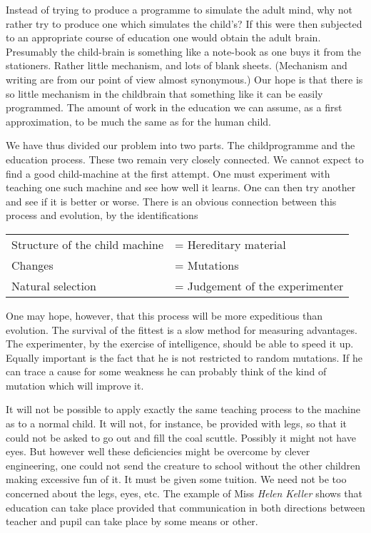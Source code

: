 \documentclass[12pt]{article}
\begin{document}
    Instead of trying to produce a programme to simulate the adult mind, why not rather try to produce one which simulates the child's? If this were then subjected to an appropriate course of education one would obtain the adult brain. Presumably the child-brain is something like a note-book as one buys it from the stationers. Rather little mechanism, and lots of blank sheets. (Mechanism and writing are from our point of view almost synonymous.) Our hope is that there is so little mechanism in the childbrain that something like it can be easily programmed. The amount of work in the education we can assume, as a first approximation, to be much the same as for the human child.

    We have thus divided our problem into two parts. The childprogramme and the education process. These two remain very closely connected. We cannot expect to find a good child-machine at the first attempt. One must experiment with teaching one such machine and see how well it learns. One can then try another and see if it is better or worse. There is an obvious connection between this process and evolution, by the identifications

    \begin{table}[]
        \begin{tabular}{ll}
        Structure of the child machine & = Hereditary material           \\
        Changes                        & = Mutations                     \\
        Natural selection              & = Judgement of the experimenter
        \end{tabular}
    \end{table}
    
    \noindent
    One may hope, however, that this process will be more expeditious than evolution. The survival of the fittest is a slow method for measuring advantages. The experimenter, by the exercise of intelligence, should be able to speed it up. Equally important is the fact that he is not restricted to random mutations. If he can trace a cause for some weakness he can probably think of the kind of mutation which will improve it.

    It will not be possible to apply exactly the same teaching process to the machine as to a normal child. It will not, for instance, be provided with legs, so that it could not be asked to go out and fill the coal scuttle. Possibly it might not have eyes. But however well these deficiencies might be overcome by clever engineering, one could not send the creature to school without the other children making excessive fun of it. It must be given some tuition. We need not be too concerned about the legs, eyes, etc. The example of Miss \textit{Helen Keller} shows that education can take place provided that communication in both directions between teacher and pupil can take place by some means or other.
\end{document}
